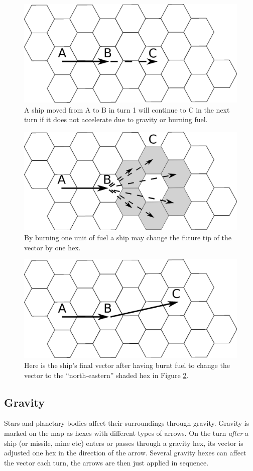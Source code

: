 \documentclass[a4paper,12pt,notitlepage,twocolumn]{article}
\begin{document}
\begin{figure}[h!]\centering  
  \includegraphics[width=0.5 \textwidth]{data/move_1.eps}  
  \caption{\footnotesize A ship moved from A to B in turn 1 will continue to C in
    the next turn if it does not accelerate due to gravity or burning
    fuel.}
\label{fig:1}
\end{figure}
\begin{figure}[h!]\centering  
  \includegraphics[width=0.5 \textwidth]{data/move_2.eps}  
  \caption{\footnotesize By burning one unit of fuel a ship may change
    the future tip of the vector by
    one hex.}
\label{fig:2}
\end{figure}
\begin{figure}[h!]\centering  
  \includegraphics[width=0.5 \textwidth]{data/move_3.eps}  
  \caption{\footnotesize Here is the ship's final vector after having burnt fuel to
    change the vector to the ``north-eastern'' shaded hex in Figure \ref{fig:2}.}
\label{fig:3}
\end{figure}

\subsection{Gravity}

Stars and planetary bodies affect their surroundings through
gravity. Gravity is marked on the map as hexes with different types of 
arrows. On the turn \emph{after} a ship (or missile, mine etc) enters or passes through a gravity
hex, its vector is adjusted one hex in the direction of the arrow.  Several gravity hexes
can affect the vector each turn, the arrows are then just applied in
sequence. 
\end{document}

